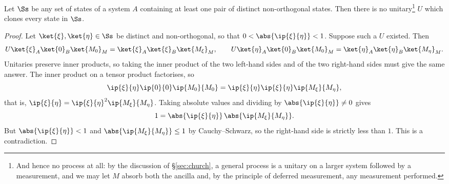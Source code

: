 \begin{center}
\end{center}

\begin{theorem}
	Let $\Ss$ be any set of states of a system $A$ containing at least one pair of distinct non-orthogonal states. Then there is no unitary\footnote{And hence no process at all: by the discussion of \S\ref{sec:church}, a general process is a unitary on a larger system followed by a measurement, and we may let $M$ absorb both the ancilla and, by the principle of deferred measurement, any measurement performed.} $U$ which clones every state in $\Ss$.
\end{theorem}

\begin{proof}
	Let $\ket{\xi}, \ket{\eta} \in \Ss$ be distinct and non-orthogonal, so that $0 < \abs{\ip{\xi}{\eta}} < 1$. Suppose such a $U$ existed. Then
	$$U\ket{\xi}_A\ket{0}_B\ket{M_0}_M = \ket{\xi}_A\ket{\xi}_B\ket{M_\xi}_M, \qquad U\ket{\eta}_A\ket{0}_B\ket{M_0}_M = \ket{\eta}_A\ket{\eta}_B\ket{M_\eta}_M.$$
	Unitaries preserve inner products, so taking the inner product of the two left-hand sides and of the two right-hand sides must give the same answer. The inner product on a tensor product factorises, so
	$$\ip{\xi}{\eta}\ip{0}{0}\ip{M_0}{M_0} = \ip{\xi}{\eta}\ip{\xi}{\eta}\ip{M_\xi}{M_\eta},$$
	that is, $\ip{\xi}{\eta} = \ip{\xi}{\eta}^2 \ip{M_\xi}{M_\eta}$. Taking absolute values and dividing by $\abs{\ip{\xi}{\eta}} \neq 0$ gives
	$$1 = \abs{\ip{\xi}{\eta}}\,\abs{\ip{M_\xi}{M_\eta}}.$$
	But $\abs{\ip{\xi}{\eta}} < 1$ and $\abs{\ip{M_\xi}{M_\eta}} \leq 1$ by Cauchy--Schwarz, so the right-hand side is strictly less than $1$. This is a contradiction.
\end{proof}


